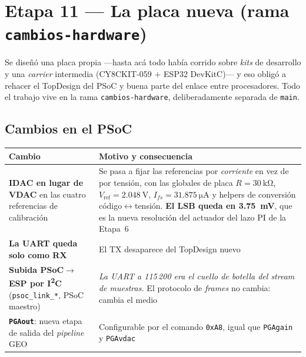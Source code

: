 \section{Etapa 11 --- La placa nueva (rama \texttt{cambios-hardware})}
\label{sec:et11}


Se dise\~n\'o una placa propia ---hasta ac\'a todo hab\'ia corrido sobre
\emph{kits} de desarrollo y una \emph{carrier} intermedia
(CY8CKIT-059 $+$ ESP32 DevKitC)--- y eso oblig\'o a rehacer el TopDesign del
PSoC y buena parte del enlace entre procesadores. Todo el trabajo vive en la
rama \texttt{cambios-hardware}, deliberadamente separada de \texttt{main}.

\subsection{Cambios en el PSoC}

\begin{center}\small
\begin{tabularx}{\textwidth}{@{}l X@{}}
\toprule
\textbf{Cambio} & \textbf{Motivo y consecuencia} \\
\midrule
\textbf{IDAC en lugar de VDAC} en las cuatro referencias de calibraci\'on &
Se pasa a fijar las referencias por \emph{corriente} en vez de por tensi\'on,
con las globales de placa $R = \SI{30}{\kilo\ohm}$,
$V_{\mathrm{ref}} = \SI{2.048}{\volt}$,
$I_{fs} = \SI{31.875}{\micro\ampere}$ y helpers de conversi\'on
c\'odigo$\leftrightarrow$tensi\'on. \textbf{El LSB queda en
\SI{3.75}{\milli\volt}}, que es la nueva resoluci\'on del actuador del lazo PI
de la Etapa~6 \\
\addlinespace[3pt]
\textbf{La UART queda solo como RX} &
El TX desaparece del TopDesign nuevo \\
\addlinespace[3pt]
\textbf{Subida PSoC$\to$ESP por I\textsuperscript{2}C} (\texttt{psoc\_link\_*}, PSoC maestro) &
\emph{La UART a 115\,200 era el cuello de botella del \emph{stream} de
muestras.} El protocolo de \emph{frames} no cambia: cambia el medio \\
\addlinespace[3pt]
\textbf{\texttt{PGAout}}: nueva etapa de salida del \emph{pipeline} GEO &
Configurable por el comando \texttt{0xA8}, igual que \texttt{PGAgain} y \texttt{PGAvdac} \\
\bottomrule
\end{tabularx}
\end{center}

